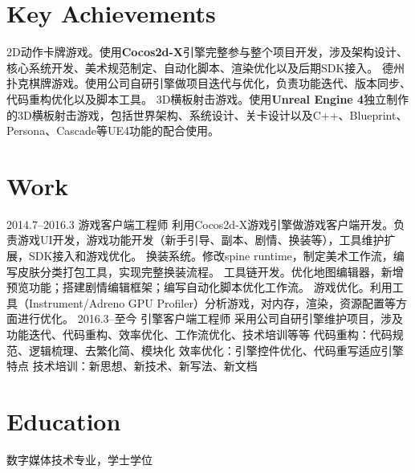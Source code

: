 \documentclass[full]{rvca}
\begin{document}
\subsection{}

\section{Key Achievements}

\achievements
{2D动作卡牌游戏。使用\textbf{Cocos2d-X}引擎完整参与整个项目开发，涉及架构设计、核心系统开发、美术规范制定、自动化脚本、渲染优化以及后期SDK接入。}
{德州扑克棋牌游戏。使用公司自研引擎做项目迭代与优化，负责功能迭代、版本同步、代码重构优化以及脚本工具。}
{3D横板射击游戏。使用\textbf{Unreal Engine 4}独立制作的3D横板射击游戏，包括世界架构、系统设计、关卡设计以及C++、Blueprint、Persona、Cascade等UE4功能的配合使用。}
{}

\section{Work}


{2014.7--2016.3}%
{游戏客户端工程师} %
{利用Cocos2d-X游戏引擎做游戏客户端开发。负责游戏UI开发，游戏功能开发（新手引导、副本、剧情、换装等），工具维护扩展，SDK接入和游戏优化。}%
{换装系统。修改spine runtime，制定美术工作流，编写皮肤分类打包工具，实现完整换装流程。}
{工具链开发。优化地图编辑器，新增预览功能；搭建剧情编辑框架；编写自动化脚本优化工作流。}
{游戏优化。利用工具（Instrument/Adreno GPU Profiler）分析游戏，对内存，渲染，资源配置等方面进行优化。}
{}
{2016.3--至今}
{引擎客户端工程师}
{采用公司自研引擎维护项目，涉及功能迭代、代码重构、效率优化、工作流优化、技术培训等等}
{代码重构：代码规范、逻辑梳理、去繁化简、模块化}
{效率优化：引擎控件优化、代码重写适应引擎特点}
{技术培训：新思想、新技术、新写法、新文档}
{}

\section{Education}

数字媒体技术专业，学士学位
\end{document}
